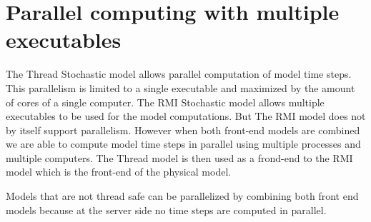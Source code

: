 \section{Parallel computing with multiple executables}
The Thread Stochastic model allows parallel computation of model time steps.
This parallelism is limited to a single executable and maximized by the amount
of cores of a single computer. The RMI Stochastic model allows multiple
executables to be used for the model computations. But The RMI model does not
by itself support parallelism. However when both front-end models are combined
we are able to compute model time steps in parallel using multiple processes
and multiple computers. The Thread model is then used as a frond-end to the RMI
model which is the front-end of the physical model.

Models that are not thread safe can be parallelized by combining both front end
models because at the server side no time steps are computed in parallel.
